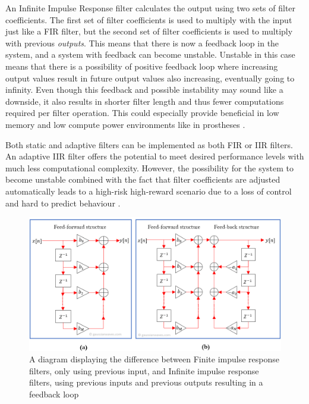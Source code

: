 An Infinite Impulse Response filter calculates the output using two sets of filter coefficients. The first set of filter coefficients is used to multiply with the input just like a FIR filter, but the second set of filter coefficients is used to multiply with previous \textit{outputs}. This means that there is now a feedback loop in the system, and a system with feedback can become unstable. Unstable in this case means that there is a possibility of positive feedback loop where increasing output values result in future output values also increasing, eventually going to infinity. Even though this feedback and possible instability may sound like a downside, it also results in shorter filter length and thus fewer computations required per filter operation. This could especially provide beneficial in low memory and low compute power environments like in prostheses \cite{fir_vs_iir}.

Both static and adaptive filters can be implemented as both FIR or IIR filters. An adaptive IIR filter offers the potential to meet desired performance levels with much less computational complexity. However, the possibility for the system to become unstable combined with the fact that filter coefficients are adjusted automatically leads to a high-risk high-reward scenario due to a loss of control and hard to predict behaviour \cite{digital_signal_processing_handbook}.

\begin{figure}[h!t]
	\begin{center}
		\includegraphics[width=1.0\columnwidth]{images/fir_vs_iir_diagram.png}
	\end{center}
	\caption{A diagram displaying the difference between Finite impulse response filters, only using previous input, and Infinite impulse response filters, using previous inputs and previous outputs resulting in a feedback loop \cite{fir_vs_iir_diagram}}
	\label{fig:fir_vs_iir_diagram}
\end{figure}


